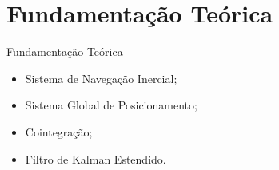 \section{Fundamentação Teórica}
\label{sec:fundamentacao-teorica}

\begin{frame}{Fundamentação Teórica}
	\begin{itemize}
		\item Sistema de Navegação Inercial;
		\item Sistema Global de Posicionamento;
		\item Cointegração;
		\item Filtro de Kalman Estendido.
	\end{itemize}
\end{frame}



